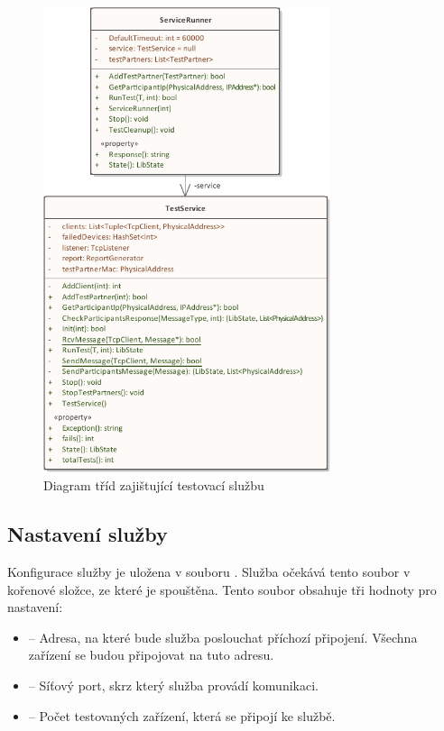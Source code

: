 \begin{figure}[H]
    \centering 
    \includegraphics[width=0.75\textwidth]{assets/img/class_diagram/service.pdf}
    \caption{Diagram tříd zajištující testovací službu}
    \label{fig:test_service}
\end{figure}

\subsection{Nastavení služby}\label{sec:settings}

Konfigurace služby je uložena v souboru . Služba očekává tento soubor v kořenové složce, ze které je spouštěna. Tento soubor obsahuje tři hodnoty pro nastavení:

\begin{itemize}
    \item {} -- Adresa, na které bude služba poslouchat příchozí připojení. Všechna zařízení se budou připojovat na tuto adresu.
    \item {} -- Síťový port, skrz který služba provádí komunikaci.
    \item {} -- Počet testovaných zařízení, která se připojí ke službě.   
\end{itemize}

